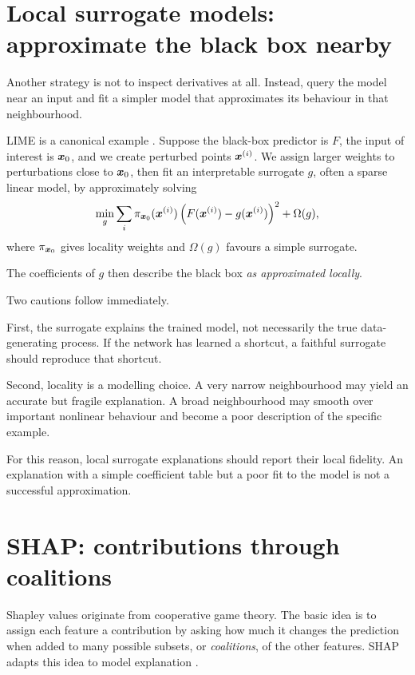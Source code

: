 \section{Local surrogate models: approximate the black box nearby}

Another strategy is not to inspect derivatives at all. Instead, query the model near an input and fit a simpler model that approximates its behaviour in that neighbourhood.

LIME is a canonical example \parencite{ribeiro2016}. Suppose the black-box predictor is \(F\), the input of interest is \(\bm{x}_0\), and we create perturbed points \(\bm{x}^{(i)}\). We assign larger weights to perturbations close to \(\bm{x}_0\), then fit an interpretable surrogate \(g\), often a sparse linear model, by approximately solving
\[
  \min_g
  \sum_i
  \pi_{\bm{x}_0}(\bm{x}^{(i)})
  \left(F(\bm{x}^{(i)})-g(\bm{x}^{(i)})\right)^2
  + \Omega(g),
\]
where \(\pi_{\bm{x}_0}\) gives locality weights and \(\Omega(g)\) favours a simple surrogate.

The coefficients of \(g\) then describe the black box \emph{as approximated locally}.

Two cautions follow immediately.

First, the surrogate explains the trained model, not necessarily the true data-generating process. If the network has learned a shortcut, a faithful surrogate should reproduce that shortcut.

Second, locality is a modelling choice. A very narrow neighbourhood may yield an accurate but fragile explanation. A broad neighbourhood may smooth over important nonlinear behaviour and become a poor description of the specific example.

For this reason, local surrogate explanations should report their local fidelity. An explanation with a simple coefficient table but a poor fit to the model is not a successful approximation.

\section{SHAP: contributions through coalitions}

Shapley values originate from cooperative game theory. The basic idea is to assign each feature a contribution by asking how much it changes the prediction when added to many possible subsets, or \emph{coalitions}, of the other features. SHAP adapts this idea to model explanation \parencite{lundberg2017}.


